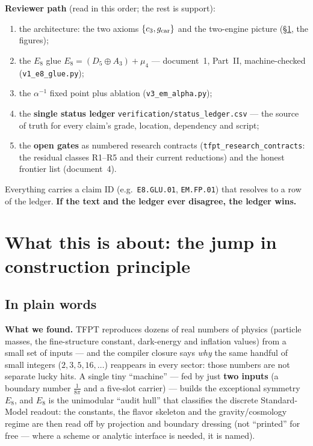 \noindent\textbf{Reviewer path} (read in this order; the rest is support):
\begin{enumerate}[leftmargin=1.7em,itemsep=1pt]
\item the architecture: the two axioms $\{c_3,g_{\mathrm{car}}\}$ and the two-engine picture (\S\ref{sec:docmap}, the figures);
\item the $E_8$ glue $E_8{=}(D_5{\oplus}A_3){+}\mu_4$ --- document~1, Part~II, machine-checked (\texttt{v1\_e8\_glue.py});
\item the $\alpha^{-1}$ fixed point plus ablation (\texttt{v3\_em\_alpha.py});
\item the \textbf{single status ledger} \texttt{verification/status\_ledger.csv} --- the source of truth for every claim's grade, location, dependency and script;
\item the \textbf{open gates} as numbered research contracts (\texttt{tfpt\_research\_contracts}: the residual classes R1--R5 and their current reductions) and the honest frontier list (document~4).
\end{enumerate}
\noindent Everything carries a claim ID (e.g.\ \texttt{E8.GLU.01}, \texttt{EM.FP.01}) that resolves to a row of the
ledger. \textbf{If the text and the ledger ever disagree, the ledger wins.}

\section{What this is about: the jump in construction principle}\label{sec:docmap}

\subsection*{In plain words}

\noindent\textbf{What we found.} TFPT reproduces dozens of real numbers of physics (particle masses, the
fine-structure constant, dark-energy and inflation values) from a small set of inputs --- and the
compiler closure says \emph{why} the same handful of small integers ($2,3,5,16,\dots$) reappears in
every sector: those numbers are not separate lucky hits. A single tiny ``machine'' --- fed by just
\textbf{two inputs} (a boundary number $\tfrac1{8\pi}$ and a five-slot carrier) --- builds the
exceptional symmetry $E_8$, and $E_8$ is the unimodular ``audit hull'' that classifies the discrete
Standard-Model readout: the constants, the flavor skeleton and the gravity/cosmology regime are then
read off by projection and boundary dressing (not ``printed'' for free --- where a scheme or analytic
interface is needed, it is named).

